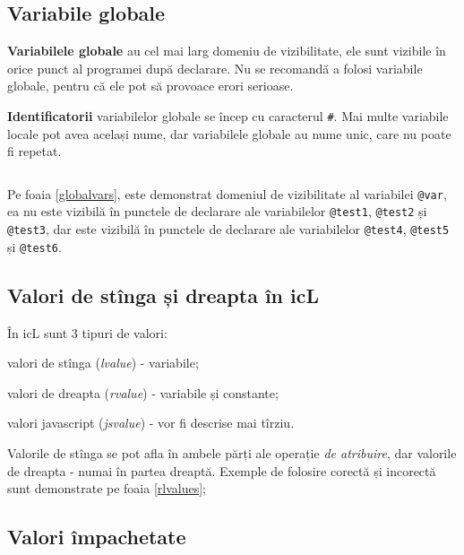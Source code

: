 \subsection{Variabile globale}

\textbf{Variabilele globale} au cel mai larg domeniu de vizibilitate, ele sunt vizibile în orice punct al programei după declarare. Nu se recomandă a folosi variabile globale, pentru că ele pot să provoace erori serioase.

{\bf Identificatorii} variabilelor globale se încep cu caracterul {\color{blue2}\texttt{#}}. Mai multe variabile locale pot avea același nume, dar variabilele globale au nume unic, care nu poate fi repetat.

\begin{sourcecode}
    \label{localvars}
    \inputminted[linenos]{icl}{../sources/localvars.icL}
\end{sourcecode}

Pe foaia \ref{globalvars}, este demonstrat domeniul de vizibilitate al variabilei \texttt{@var}, ea nu este vizibilă în punctele de declarare ale variabilelor \texttt{@test1}, \texttt{@test2} și \texttt{@test3}, dar este vizibilă în punctele de declarare ale variabilelor \texttt{@test4}, \texttt{@test5} și \texttt{@test6}.

\subsection{Valori de stînga și dreapta în icL}

În icL sunt 3 tipuri de valori:

\begin{icEnum}
\item
	valori de stînga ({\it lvalue}) - variabile;
\item
	valori de dreapta ({\it rvalue}) - variabile și constante;
\item
	valori javascript ({\it jsvalue}) - vor fi descrise mai tîrziu.
\end{icEnum}

Valorile de stînga se pot afla în ambele părți ale operație {\it de atribuire}, dar valorile de dreapta - numai în partea dreaptă. Exemple de folosire corectă și incorectă sunt demonstrate pe foaia \ref{rlvalues};

\subsection{Valori împachetate}

